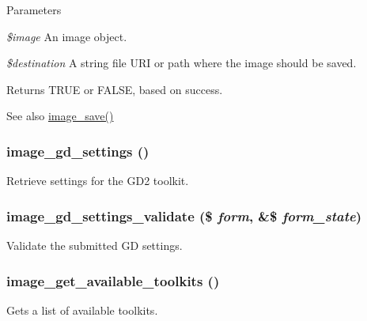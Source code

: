 \begin{DoxyParams}{Parameters}
\item[{\em \$image}]An image object. \item[{\em \$destination}]A string file URI or path where the image should be saved. \end{DoxyParams}
\begin{DoxyReturn}{Returns}
TRUE or FALSE, based on success.
\end{DoxyReturn}
\begin{DoxySeeAlso}{See also}
\hyperlink{group__image_ga134df2e4d035378b52e866618c164f3b}{image\_\-save()} 
\end{DoxySeeAlso}
\hypertarget{group__image_ga2a492c31e41c59af2b7e976e28886b15}{
\subsubsection[{image\_\-gd\_\-settings}]{\setlength{\rightskip}{0pt plus 5cm}image\_\-gd\_\-settings ()}}
\label{group__image_ga2a492c31e41c59af2b7e976e28886b15}
Retrieve settings for the GD2 toolkit. \hypertarget{group__image_gaab4f4ec4e8bc9abc51939a4194848fbb}{
\subsubsection[{image\_\-gd\_\-settings\_\-validate}]{\setlength{\rightskip}{0pt plus 5cm}image\_\-gd\_\-settings\_\-validate (\$ {\em form}, \/  \&\$ {\em form\_\-state})}}
\label{group__image_gaab4f4ec4e8bc9abc51939a4194848fbb}
Validate the submitted GD settings. \hypertarget{group__image_ga190b9b90f931916a5766ed11c29b9326}{
\subsubsection[{image\_\-get\_\-available\_\-toolkits}]{\setlength{\rightskip}{0pt plus 5cm}image\_\-get\_\-available\_\-toolkits ()}}
\label{group__image_ga190b9b90f931916a5766ed11c29b9326}
Gets a list of available toolkits.

